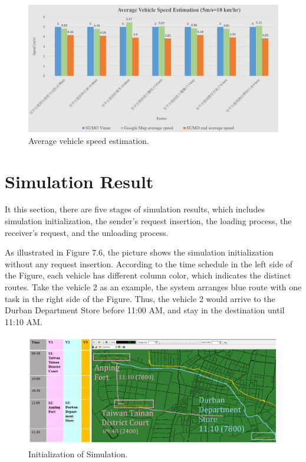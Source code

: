 \documentclass[12pt]{ksthesis}
\begin{document}
\begin{thesis}
{\begin{figure}[H]
\centering
\includegraphics[width=1.14\textwidth]{./Thesis_figures/F7-5_speedEstimation.PNG}
\caption{\large Average vehicle speed estimation.}
\vspace{0.5cm}
\label{Fig:Average_vehicleSpeedEstimation}
\end{figure}

\section{Simulation Result}
It this section, there are five stages of simulation results, which includes simulation initialization, the sender’s request insertion, the loading process, the receiver’s request, and the unloading process.

As illustrated in Figure 7.6, the picture shows the simulation initialization without any request insertion. According to the time schedule in the left side of the Figure, each vehicle has different column color, which indicates the distinct routes. Take the vehicle 2 as an example, the system arranges blue route with one task in the right side of the Figure. Thus, the vehicle 2 would arrive to the Durban Department Store before 11:00 AM, and stay in the destination until 11:10 AM.

\begin{figure}[H]
\centering
\includegraphics[width=1.12\textwidth]{./Thesis_figures/F7-6_initialization.PNG}
\caption{\large Initialization of Simulation.}
\vspace{0.5cm}
\label{Fig:Initialization_of_Simulation}
\end{figure}

}
\end{thesis}
\end{document}
